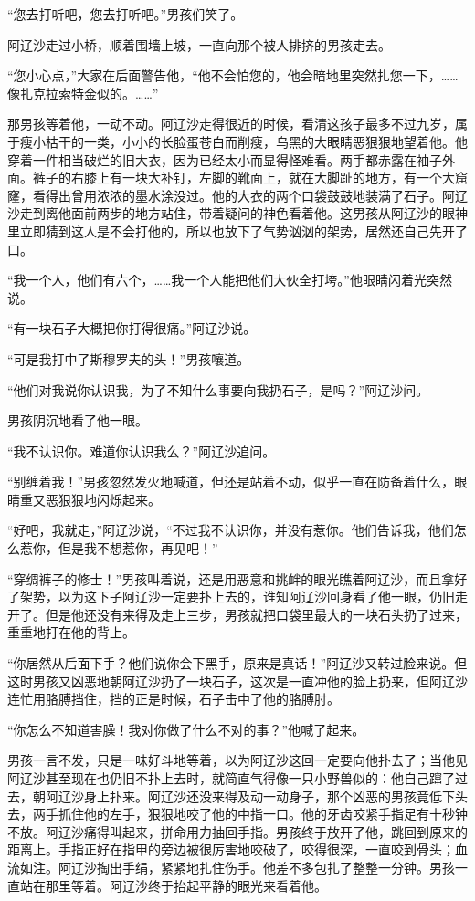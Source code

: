 \par “您去打听吧，您去打听吧。”男孩们笑了。
\par 阿辽沙走过小桥，顺着围墙上坡，一直向那个被人排挤的男孩走去。
\par “您小心点，”大家在后面警告他，“他不会怕您的，他会暗地里突然扎您一下，……像扎克拉索特金似的。……”
\par 那男孩等着他，一动不动。阿辽沙走得很近的时候，看清这孩子最多不过九岁，属于瘦小枯干的一类，小小的长脸蛋苍白而削瘦，乌黑的大眼睛恶狠狠地望着他。他穿着一件相当破烂的旧大衣，因为已经太小而显得怪难看。两手都赤露在袖子外面。裤子的右膝上有一块大补钉，左脚的靴面上，就在大脚趾的地方，有一个大窟窿，看得出曾用浓浓的墨水涂没过。他的大衣的两个口袋鼓鼓地装满了石子。阿辽沙走到离他面前两步的地方站住，带着疑问的神色看着他。这男孩从阿辽沙的眼神里立即猜到这人是不会打他的，所以也放下了气势汹汹的架势，居然还自己先开了口。
\par “我一个人，他们有六个，……我一个人能把他们大伙全打垮。”他眼睛闪着光突然说。
\par “有一块石子大概把你打得很痛。”阿辽沙说。
\par “可是我打中了斯穆罗夫的头！”男孩嚷道。
\par “他们对我说你认识我，为了不知什么事要向我扔石子，是吗？”阿辽沙问。
\par 男孩阴沉地看了他一眼。
\par “我不认识你。难道你认识我么？”阿辽沙追问。
\par “别缠着我！”男孩忽然发火地喊道，但还是站着不动，似乎一直在防备着什么，眼睛重又恶狠狠地闪烁起来。
\par “好吧，我就走，”阿辽沙说，“不过我不认识你，并没有惹你。他们告诉我，他们怎么惹你，但是我不想惹你，再见吧！”
\par “穿绸裤子的修士！”男孩叫着说，还是用恶意和挑衅的眼光瞧着阿辽沙，而且拿好了架势，以为这下子阿辽沙一定要扑上去的，谁知阿辽沙回身看了他一眼，仍旧走开了。但是他还没有来得及走上三步，男孩就把口袋里最大的一块石头扔了过来，重重地打在他的背上。
\par “你居然从后面下手？他们说你会下黑手，原来是真话！”阿辽沙又转过脸来说。但这时男孩又凶恶地朝阿辽沙扔了一块石子，这次是一直冲他的脸上扔来，但阿辽沙连忙用胳膊挡住，挡的正是时候，石子击中了他的胳膊肘。
\par “你怎么不知道害臊！我对你做了什么不对的事？”他喊了起来。
\par 男孩一言不发，只是一味好斗地等着，以为阿辽沙这回一定要向他扑去了；当他见阿辽沙甚至现在也仍旧不扑上去时，就简直气得像一只小野兽似的：他自己蹿了过去，朝阿辽沙身上扑来。阿辽沙还没来得及动一动身子，那个凶恶的男孩竟低下头去，两手抓住他的左手，狠狠地咬了他的中指一口。他的牙齿咬紧手指足有十秒钟不放。阿辽沙痛得叫起来，拼命用力抽回手指。男孩终于放开了他，跳回到原来的距离上。手指正好在指甲的旁边被很厉害地咬破了，咬得很深，一直咬到骨头；血流如注。阿辽沙掏出手绢，紧紧地扎住伤手。他差不多包扎了整整一分钟。男孩一直站在那里等着。阿辽沙终于抬起平静的眼光来看着他。
